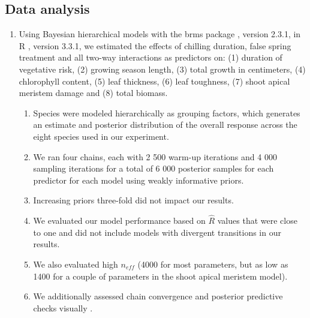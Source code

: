 \documentclass{article}\usepackage[]{graphicx}\usepackage[]{color}
\begin{document}
\subsection*{Data analysis}
\begin{enumerate}
\item Using Bayesian hierarchical models with the brms package \citep{brms}, version 2.3.1,  in R \citep{R}, version 3.3.1, we estimated the effects of chilling duration, false spring treatment and all two-way interactions as predictors on: (1) duration of vegetative risk, (2) growing season length, (3) total growth in centimeters, (4) chlorophyll content, (5) leaf thickness, (6) leaf toughness, (7) shoot apical meristem damage and (8) total biomass. %
  \begin{enumerate} 
  \item Species were modeled hierarchically as grouping factors, which generates an estimate and posterior distribution of the overall response across the eight species used in our experiment.
  \item We ran four chains, each with 2 500 warm-up iterations and 4 000 sampling iterations for a total of 6 000 posterior samples for each predictor for each model using weakly informative priors. 
  \item Increasing priors three-fold did not impact our results.
  \item We evaluated our model performance based on $\hat{R}$ values that were close to one and did not include models with divergent transitions in our results. 
  \item We also evaluated high $n_{eff}$ (4000 for most parameters, but as low as 1400 for a couple of parameters in the shoot apical meristem model). 
  \item We additionally assessed chain convergence and posterior predictive checks visually \citep{BDA}.
  \end{enumerate}
\end{enumerate}
\end{document}
